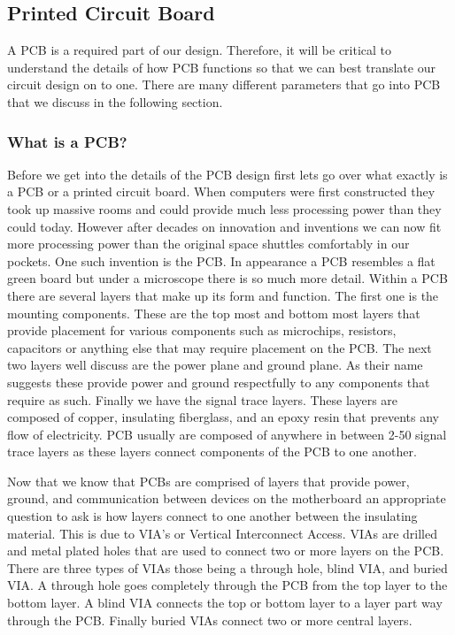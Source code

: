 \subsection{Printed Circuit Board}
A PCB is a required part of our design. Therefore, it will be critical to understand the details of how PCB functions so that we can best translate our circuit design on to one. There are many different parameters that go into PCB that we discuss in the following section.

\subsubsection{What is a PCB?}
Before we get into the details of the PCB design first lets go over what exactly is a PCB or a printed circuit board. When computers were first constructed they took up massive rooms and could provide much less processing power than they could today. However after decades on innovation and inventions we can now fit more processing power than the original space shuttles comfortably in our pockets. One such invention is the PCB. In appearance a PCB resembles a flat green board but under a microscope there is so much more detail. Within a PCB there are several layers that make up its form and function. The first one is the mounting components. These are the top most and bottom most layers that provide placement for various components such as microchips, resistors, capacitors or anything else that may require placement on the PCB. The next two layers well discuss are the power plane and ground plane. As their name suggests these provide power and ground respectfully to any components that require as such. Finally we have the signal trace layers. These layers are composed of copper, insulating fiberglass, and an epoxy resin that prevents any flow of electricity. PCB usually are composed of anywhere in between 2-50 signal trace layers as these layers connect components of the PCB to one another. 

Now that we know that PCBs are comprised of layers that provide power, ground, and communication between devices on the motherboard an appropriate question to ask is how layers connect to one another between the insulating material. This is due to VIA's or Vertical Interconnect Access. VIAs are drilled and metal plated holes that are used to connect two or more layers on the PCB. There are three types of VIAs those being a through hole, blind VIA, and buried VIA. A through hole goes completely through the PCB from the top layer to the bottom layer. A blind VIA connects the top or bottom layer to a layer part way through the PCB. Finally buried VIAs connect two or more central layers. 

